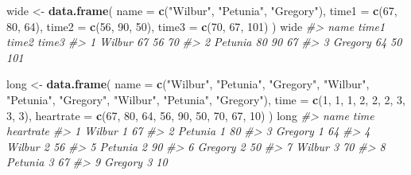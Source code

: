 \documentclass[
]{book}
\newenvironment{Shaded}{\begin{snugshade}}{\end{snugshade}}
\newcommand{\CommentTok}[1]{\textcolor[rgb]{0.56,0.35,0.01}{\textit{#1}}}
\newcommand{\DataTypeTok}[1]{\textcolor[rgb]{0.13,0.29,0.53}{#1}}
\newcommand{\DecValTok}[1]{\textcolor[rgb]{0.00,0.00,0.81}{#1}}
\newcommand{\KeywordTok}[1]{\textcolor[rgb]{0.13,0.29,0.53}{\textbf{#1}}}
\newcommand{\NormalTok}[1]{#1}
\newcommand{\StringTok}[1]{\textcolor[rgb]{0.31,0.60,0.02}{#1}}
\begin{document}
\begin{Shaded}
\begin{Highlighting}[]
\NormalTok{wide <-}\StringTok{ }\KeywordTok{data.frame}\NormalTok{(}
  \DataTypeTok{name =} \KeywordTok{c}\NormalTok{(}\StringTok{"Wilbur"}\NormalTok{, }\StringTok{"Petunia"}\NormalTok{, }\StringTok{"Gregory"}\NormalTok{),}
  \DataTypeTok{time1 =} \KeywordTok{c}\NormalTok{(}\DecValTok{67}\NormalTok{, }\DecValTok{80}\NormalTok{, }\DecValTok{64}\NormalTok{),}
  \DataTypeTok{time2 =} \KeywordTok{c}\NormalTok{(}\DecValTok{56}\NormalTok{, }\DecValTok{90}\NormalTok{, }\DecValTok{50}\NormalTok{),}
  \DataTypeTok{time3 =} \KeywordTok{c}\NormalTok{(}\DecValTok{70}\NormalTok{, }\DecValTok{67}\NormalTok{, }\DecValTok{101}\NormalTok{)}
\NormalTok{)}
\NormalTok{wide}
\CommentTok{#>      name time1 time2 time3}
\CommentTok{#> 1  Wilbur    67    56    70}
\CommentTok{#> 2 Petunia    80    90    67}
\CommentTok{#> 3 Gregory    64    50   101}

\NormalTok{long <-}\StringTok{ }\KeywordTok{data.frame}\NormalTok{(}
  \DataTypeTok{name =} \KeywordTok{c}\NormalTok{(}\StringTok{"Wilbur"}\NormalTok{, }\StringTok{"Petunia"}\NormalTok{, }\StringTok{"Gregory"}\NormalTok{, }\StringTok{"Wilbur"}\NormalTok{, }\StringTok{"Petunia"}\NormalTok{, }\StringTok{"Gregory"}\NormalTok{, }\StringTok{"Wilbur"}\NormalTok{, }\StringTok{"Petunia"}\NormalTok{, }\StringTok{"Gregory"}\NormalTok{),}
  \DataTypeTok{time =} \KeywordTok{c}\NormalTok{(}\DecValTok{1}\NormalTok{, }\DecValTok{1}\NormalTok{, }\DecValTok{1}\NormalTok{, }\DecValTok{2}\NormalTok{, }\DecValTok{2}\NormalTok{, }\DecValTok{2}\NormalTok{, }\DecValTok{3}\NormalTok{, }\DecValTok{3}\NormalTok{, }\DecValTok{3}\NormalTok{),}
  \DataTypeTok{heartrate =} \KeywordTok{c}\NormalTok{(}\DecValTok{67}\NormalTok{, }\DecValTok{80}\NormalTok{, }\DecValTok{64}\NormalTok{, }\DecValTok{56}\NormalTok{, }\DecValTok{90}\NormalTok{, }\DecValTok{50}\NormalTok{, }\DecValTok{70}\NormalTok{, }\DecValTok{67}\NormalTok{, }\DecValTok{10}\NormalTok{)}
\NormalTok{)}
\NormalTok{long}
\CommentTok{#>      name time heartrate}
\CommentTok{#> 1  Wilbur    1        67}
\CommentTok{#> 2 Petunia    1        80}
\CommentTok{#> 3 Gregory    1        64}
\CommentTok{#> 4  Wilbur    2        56}
\CommentTok{#> 5 Petunia    2        90}
\CommentTok{#> 6 Gregory    2        50}
\CommentTok{#> 7  Wilbur    3        70}
\CommentTok{#> 8 Petunia    3        67}
\CommentTok{#> 9 Gregory    3        10}
\end{Highlighting}
\end{Shaded}
\end{document}
